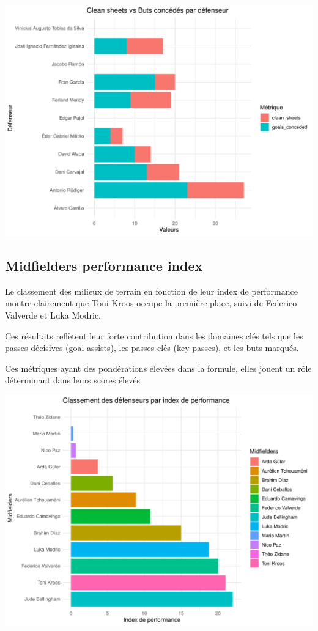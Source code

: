 \documentclass[
  6pt,
]{article}
\begin{document}
\begin{center}\includegraphics[width=0.8\linewidth]{Analyse_Impact_Performances_Joueurs_files/figure-latex/Contribution-def-1} \end{center}

\subsection{Midfielders performance
index}\label{midfielders-performance-index}

Le classement des milieux de terrain en fonction de leur index de
performance montre clairement que Toni Kroos occupe la première place,
suivi de Federico Valverde et Luka Modric.

Ces résultats reflètent leur forte contribution dans les domaines clés
tels que les passes décisives (goal assists), les passes clés (key
passes), et les buts marqués.

Ces métriques ayant des pondérations élevées dans la formule, elles
jouent un rôle déterminant dans leurs scores élevés

\begin{center}\includegraphics[width=0.8\linewidth]{Analyse_Impact_Performances_Joueurs_files/figure-latex/performance index-mid-1} \end{center}
\end{document}
